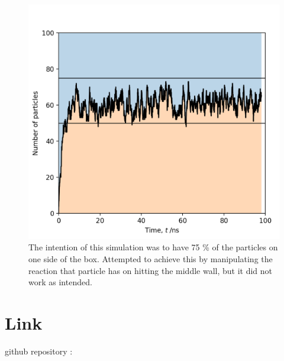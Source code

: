 \documentclass{article}
\begin{document}
\begin{figure}[H]
    \begin{minipage}[c]{0.5\textwidth}
    \includegraphics[width=\textwidth]{Figure_4.png}
    \end{minipage}\hfill
    \begin{minipage}[c]{0.5\textwidth}
    \caption{
        The intention of this simulation was to have 75 \% of the particles on one side of the box.
        Attempted to achieve this by manipulating the reaction that particle has on hitting the 
        middle wall, but it did not work as intended.
    } \label{fig:4}
    \end{minipage}
\end{figure}

\section{Link}

github repository :
\end{document}
